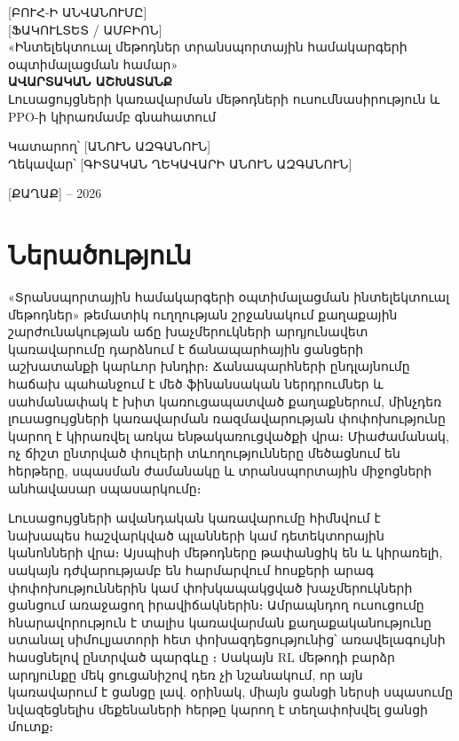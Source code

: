 \documentclass[12pt,a4paper]{extreport}
\begin{document}
\begin{titlepage}
\begin{center}
{\large [ԲՈՒՀ-Ի ԱՆՎԱՆՈՒՄԸ]}\\[0.5cm]
{\large [ՖԱԿՈՒԼՏԵՏ / ԱՄԲԻՈՆ]}\\[2.0cm]
{\large «Ինտելեկտուալ մեթոդներ տրանսպորտային համակարգերի օպտիմալացման համար»}\\[1.5cm]
{\Large\bfseries ԱՎԱՐՏԱԿԱՆ ԱՇԽԱՏԱՆՔ}\\[0.8cm]
{\large Լուսացույցների կառավարման մեթոդների ուսումնասիրություն և PPO-ի կիրառմամբ գնահատում}\\[2.0cm]
\end{center}
\begin{flushright}
Կատարող՝ [ԱՆՈՒՆ ԱԶԳԱՆՈՒՆ]\\[0.3cm]
Ղեկավար՝ [ԳԻՏԱԿԱՆ ՂԵԿԱՎԱՐԻ ԱՆՈՒՆ ԱԶԳԱՆՈՒՆ]\\
\end{flushright}
\vfill
\begin{center}
[ՔԱՂԱՔ] -- 2026
\end{center}
\end{titlepage}

\renewcommand{\contentsname}{Բովանդակություն}
\tableofcontents
\clearpage


\chapter*{Ներածություն}

«Տրանսպորտային համակարգերի օպտիմալացման ինտելեկտուալ մեթոդներ» թեմատիկ ուղղության շրջանակում քաղաքային շարժունակության աճը խաչմերուկների արդյունավետ կառավարումը դարձնում է ճանապարհային ցանցերի աշխատանքի կարևոր խնդիր։ Ճանապարհների ընդլայնումը հաճախ պահանջում է մեծ ֆինանսական ներդրումներ և սահմանափակ է խիտ կառուցապատված քաղաքներում, մինչդեռ լուսացույցների կառավարման ռազմավարության փոփոխությունը կարող է կիրառվել առկա ենթակառուցվածքի վրա։ Միաժամանակ, ոչ ճիշտ ընտրված փուլերի տևողությունները մեծացնում են հերթերը, սպասման ժամանակը և տրանսպորտային միջոցների անհավասար սպասարկումը։

Լուսացույցների ավանդական կառավարումը հիմնվում է նախապես հաշվարկված պլանների կամ դետեկտորային կանոնների վրա։ Այսպիսի մեթոդները թափանցիկ են և կիրառելի, սակայն դժվարությամբ են հարմարվում հոսքերի արագ փոփոխություններին կամ փոխկապակցված խաչմերուկների ցանցում առաջացող իրավիճակներին։ Ամրապնդող ուսուցումը հնարավորություն է տալիս կառավարման քաղաքականությունը ստանալ սիմուլյատորի հետ փոխազդեցությունից՝ առավելագույնի հասցնելով ընտրված պարգևը \cite{sutton2018,schulman2017}։ Սակայն RL մեթոդի բարձր արդյունքը մեկ ցուցանիշով դեռ չի նշանակում, որ այն կառավարում է ցանցը լավ. օրինակ, միայն ցանցի ներսի սպասումը նվազեցնելիս մեքենաների հերթը կարող է տեղափոխվել ցանցի մուտք։
\end{document}
